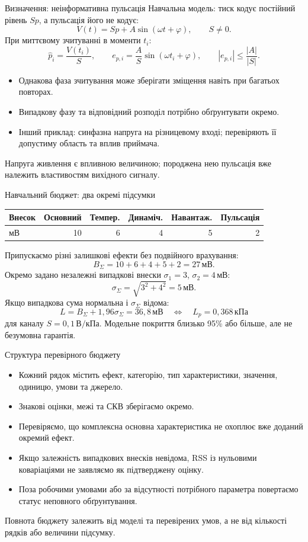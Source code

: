 \documentclass[aspectratio=169,11pt]{beamer}
\newcommand{\unit}[1]{\,\text{#1}}
\begin{document}
\begin{frame}{Визначення: неінформативна пульсація}
Навчальна модель: тиск кодує постійний рівень $Sp$, а пульсація його не кодує:
\[
V(t)=Sp+A\sin(\omega t+\varphi),\qquad S\ne0.
\]
При миттєвому зчитуванні в моменти $t_i$:
\[
\widehat p_i=\frac{V(t_i)}S,\qquad
e_{p,i}=\frac A S\sin(\omega t_i+\varphi),\qquad |e_{p,i}|\le\frac{|A|}{|S|}.
\]
\begin{itemize}
\item Однакова фаза зчитування може зберігати зміщення навіть при багатьох повторах.
\item Випадкову фазу та відповідний розподіл потрібно обґрунтувати окремо.
\item Інший приклад: синфазна напруга на різницевому вході; перевіряють її допустиму область та вплив приймача.
\end{itemize}
Напруга живлення є впливною величиною; породжена нею пульсація вже належить властивостям вихідного сигналу.
\end{frame}

\begin{frame}{Навчальний бюджет: два окремі підсумки}
\small
\begin{center}
\begin{tabular}{lrrrrr}
\toprule
Внесок & Основний & Темпер. & Динаміч. & Навантаж. & Пульсація\\\midrule
мВ & 10 & 6 & 4 & 5 & 2\\\bottomrule
\end{tabular}
\end{center}
\normalsize
Припускаємо різні залишкові ефекти без подвійного врахування:
\[
B_\Sigma=10+6+4+5+2=27\unit{мВ}.
\]
Окремо задано незалежні випадкові внески $\sigma_1=3$, $\sigma_2=4\unit{мВ}$:
\[
\sigma_\Sigma=\sqrt{3^2+4^2}=5\unit{мВ}.
\]
Якщо випадкова сума нормальна і $\sigma_\Sigma$ відома:
\[
L=B_\Sigma+1{,}96\sigma_\Sigma=36{,}8\unit{мВ}
\quad\Longleftrightarrow\quad L_p=0{,}368\unit{кПа}
\]
для каналу $S=0{,}1\unit{В/кПа}$. Модельне покриття близько 95\% або більше, але не безумовна гарантія.
\end{frame}

\begin{frame}{Структура перевірного бюджету}
\begin{itemize}
\item Кожний рядок містить ефект, категорію, тип характеристики, значення, одиницю, умови та джерело.
\item Знакові оцінки, межі та СКВ зберігаємо окремо.
\item Перевіряємо, що комплексна основна характеристика не охоплює вже доданий окремий ефект.
\item Якщо залежність випадкових внесків невідома, RSS із нульовими коваріаціями не заявляємо як підтверджену оцінку.
\item Поза робочими умовами або за відсутності потрібного параметра повертаємо статус неповного обґрунтування.
\end{itemize}
Повнота бюджету залежить від моделі та перевірених умов, а не від кількості рядків або величини підсумку.
\end{frame}
\end{document}
